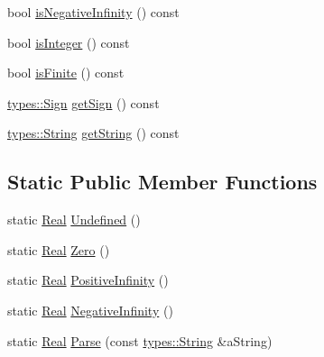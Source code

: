 \begin{DoxyCompactItemize}
bool \hyperlink{classlibrary_1_1core_1_1types_1_1_real_a5d7286e45a9f05cda79402c9d8efbc13}{is\+Negative\+Infinity} () const
\item 
bool \hyperlink{classlibrary_1_1core_1_1types_1_1_real_ad2709f64d24cb119403a0a6d386f5eda}{is\+Integer} () const
\item 
bool \hyperlink{classlibrary_1_1core_1_1types_1_1_real_a3355dd60d401e1f464d0bc20be9a32d5}{is\+Finite} () const
\item 
\hyperlink{namespacelibrary_1_1core_1_1types_a06d9eaa410d43a0fa3f383040618e87d}{types\+::\+Sign} \hyperlink{classlibrary_1_1core_1_1types_1_1_real_a0e92ad5d5a946dcc64385e1bf47003c8}{get\+Sign} () const
\item 
\hyperlink{classlibrary_1_1core_1_1types_1_1_string}{types\+::\+String} \hyperlink{classlibrary_1_1core_1_1types_1_1_real_ac075065c78713b32a2144756efaae7b0}{get\+String} () const
\end{DoxyCompactItemize}
\subsection*{Static Public Member Functions}
\begin{DoxyCompactItemize}
\item 
static \hyperlink{classlibrary_1_1core_1_1types_1_1_real}{Real} \hyperlink{classlibrary_1_1core_1_1types_1_1_real_a67778e3d4c5a5b6ca6ddcd47964b9a79}{Undefined} ()
\item 
static \hyperlink{classlibrary_1_1core_1_1types_1_1_real}{Real} \hyperlink{classlibrary_1_1core_1_1types_1_1_real_a35434e6329366cb571efbd9c4ead6501}{Zero} ()
\item 
static \hyperlink{classlibrary_1_1core_1_1types_1_1_real}{Real} \hyperlink{classlibrary_1_1core_1_1types_1_1_real_a7f4aa42fec951281e976eebca95e695e}{Positive\+Infinity} ()
\item 
static \hyperlink{classlibrary_1_1core_1_1types_1_1_real}{Real} \hyperlink{classlibrary_1_1core_1_1types_1_1_real_a04f125b4861a4f348b9754fc65fbbb43}{Negative\+Infinity} ()
\item 
static \hyperlink{classlibrary_1_1core_1_1types_1_1_real}{Real} \hyperlink{classlibrary_1_1core_1_1types_1_1_real_a7ec624abaddba3a9cabf094a6a69f484}{Parse} (const \hyperlink{classlibrary_1_1core_1_1types_1_1_string}{types\+::\+String} \&a\+String)
\end{DoxyCompactItemize}
